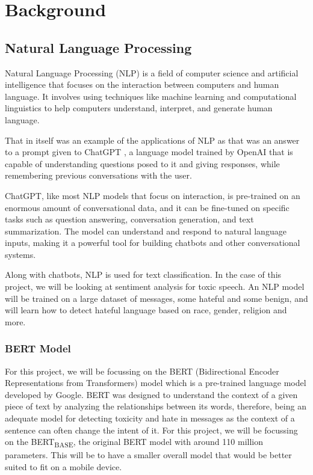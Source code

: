 \chapter{Background}

\section{Natural Language Processing}

Natural Language Processing (NLP) is a field of computer science and artificial intelligence that focuses on the interaction between computers and human language. It involves using techniques like machine learning and computational linguistics to help computers understand, interpret, and generate human language.

That in itself was an example of the applications of NLP as that was an answer to a prompt given to ChatGPT \cite{ChatGPT}, a language model trained by OpenAI that is capable of understanding questions posed to it and giving responses, while remembering previous conversations with the user. 

ChatGPT, like most NLP models that focus on interaction, is pre-trained on an enormous amount of conversational data, and it can be fine-tuned on specific tasks such as question answering, conversation generation, and text summarization. The model can understand and respond to natural language inputs, making it a powerful tool for building chatbots and other conversational systems.

Along with chatbots, NLP is used for text classification. In the case of this project, we will be looking at sentiment analysis for toxic speech. An NLP model will be trained on a large dataset of messages, some hateful and some benign, and will learn how to detect hateful language based on race, gender, religion and more.

\subsection{BERT Model}

For this project, we will be focussing on the BERT (Bidirectional Encoder Representations from Transformers) \cite{BERT} model which is a pre-trained language model developed by Google. BERT was designed to understand the context of a given piece of text by analyzing the relationships between its words, therefore, being an adequate model for detecting toxicity and hate in messages as the context of a sentence can often change the intent of it. For this project, we will be focussing on the BERT\textsubscript{BASE}, the original BERT model with around 110 million parameters. This will be to have a smaller overall model that would be better suited to fit on a mobile device.

